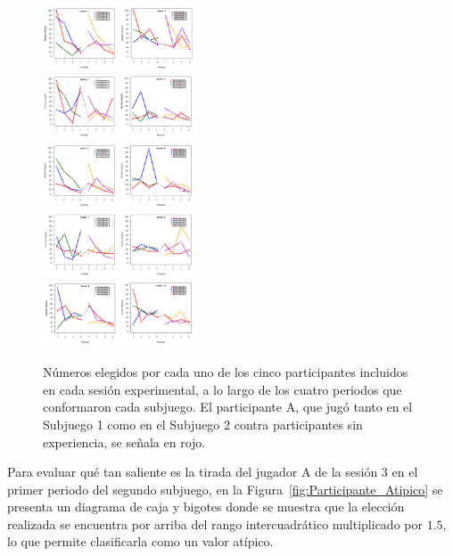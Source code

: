 \begin{figure}[th]
\centering
\includegraphics[width=0.40\textwidth]{Figures/Cambios_S12}\\
 \includegraphics[width=0.40\textwidth]{Figures/Cambios_S34}\\
 \includegraphics[width=0.40\textwidth]{Figures/Cambios_S56}\\
 \includegraphics[width=0.40\textwidth]{Figures/Cambios_S78}\\
 \includegraphics[width=0.40\textwidth]{Figures/Cambios_S910}\\
\caption[Números elegidos en cada periodo por cada jugador.]{Números elegidos por cada uno de los cinco participantes incluidos en cada sesión experimental, a lo largo de los cuatro periodos que conformaron cada  subjuego. El participante A, que jugó tanto en el Subjuego 1 como en el Subjuego 2 contra participantes sin experiencia, se señala en rojo.}
\label{fig:NumElegido}
\end{figure}

Para evaluar qué tan saliente es la tirada del jugador A de la sesión 3 en el primer periodo del segundo subjuego, en la Figura~\ref{fig:Participante_Atipico} se presenta un diagrama de caja y bigotes donde se muestra que la elección realizada se encuentra por arriba del rango intercuadrático multiplicado por $1.5$, lo que permite clasificarla como un valor atípico.\\

